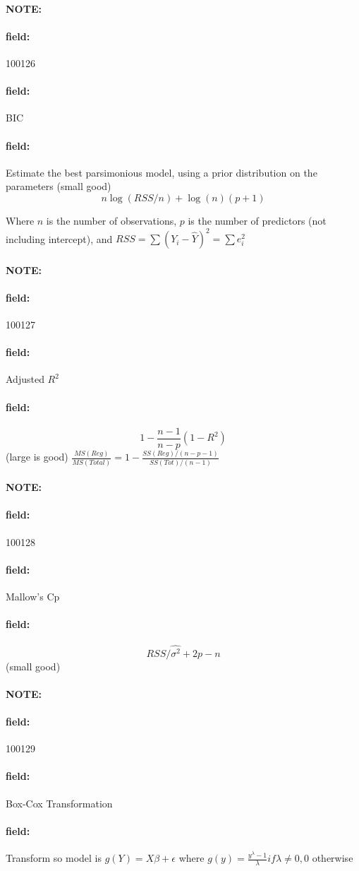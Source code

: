 \documentclass[12pt]{article}
\newenvironment{note}{\paragraph{NOTE:}}{}
\newenvironment{field}{\paragraph{field:}}{}
\begin{document}
\begin{note} \begin{field} \tiny 100126 \end{field}
 \begin{field}
  BIC
 \end{field}
 \begin{field}
  Estimate the best parsimonious model, using a prior distribution on the parameters (small good)
  $$  n \log (RSS/n) + \log(n)(p+1)$$

  Where $n$ is the number of observations, $p$ is the number of predictors (not including intercept), and $RSS = \sum (Y_i - \hat{Y})^2 = \sum e_i^2 $
 \end{field}
\end{note}


\begin{note} \begin{field} \tiny 100127 \end{field}
 \begin{field}
  Adjusted $R^2$
 \end{field}
 \begin{field}
  $$ 1 - \frac{n-1}{n-p}(1 - R^2)$$ (large is good)
  $\frac{MS(Reg)}{MS(Total)} = 1 - \frac{SS(Reg)/(n - p - 1)}{SS(Tot)/(n-1)}$
 \end{field}
\end{note}

\begin{note} \begin{field} \tiny 100128 \end{field}
 \begin{field}
  Mallow's Cp
 \end{field}
 \begin{field}
  $$ RSS/\hat{\sigma^2} + 2p - n $$ (small good)
 \end{field}
\end{note}

\begin{note} \begin{field} \tiny 100129 \end{field}
 \begin{field}
  Box-Cox Transformation
 \end{field}
 \begin{field}
  Transform so model is $g(Y) = X\beta + \epsilon$
  where $g(y) = \frac{y^\lambda -1}{\lambda} if \lambda \neq 0, 0 $ otherwise
 \end{field}
\end{note}


\end{document}
